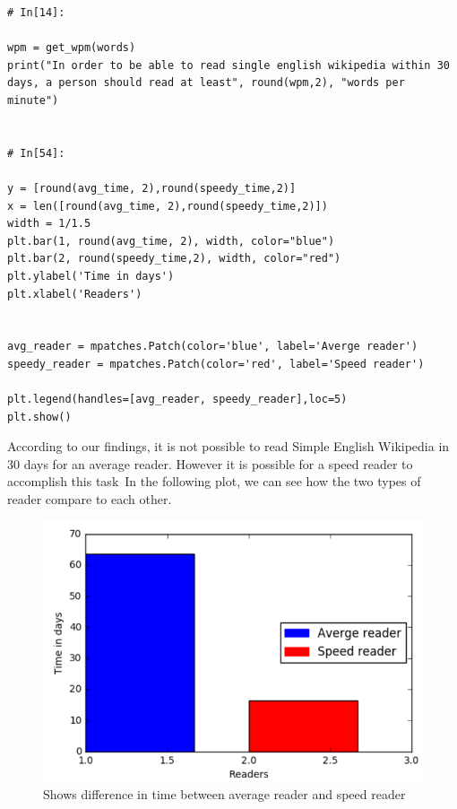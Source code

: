 \documentclass{WeSTassignment}
\begin{document}
\begin{lstlisting}
# In[14]:

wpm = get_wpm(words)
print("In order to be able to read single english wikipedia within 30 days, a person should read at least", round(wpm,2), "words per minute")


# In[54]:

y = [round(avg_time, 2),round(speedy_time,2)]
x = len([round(avg_time, 2),round(speedy_time,2)])
width = 1/1.5
plt.bar(1, round(avg_time, 2), width, color="blue")
plt.bar(2, round(speedy_time,2), width, color="red")
plt.ylabel('Time in days')
plt.xlabel('Readers')


avg_reader = mpatches.Patch(color='blue', label='Averge reader')
speedy_reader = mpatches.Patch(color='red', label='Speed reader')

plt.legend(handles=[avg_reader, speedy_reader],loc=5)
plt.show()

\end{lstlisting}

According to our findings, it is not possible to read Simple English Wikipedia in 30 days for an average reader. However it is possible for a speed reader to accomplish this task\
In the following plot, we can see how the two types of reader compare to each other.

\begin{figure}[h]
  \centering
  \includegraphics{plot.png}
   \caption{Shows difference in time between average reader and speed reader}
     \label{fig:dig} 
\end{figure}







\makefooter
\end{document}
